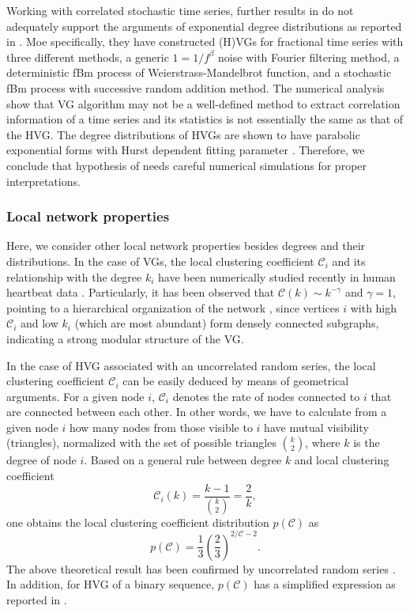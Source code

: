 		Working with correlated stochastic time series, further results in \cite{Manshour2015} do not adequately support the arguments of exponential degree distributions as reported in \cite{Lacasa2010}. Moe specifically, they have constructed (H)VGs for fractional time series with three different methods, a generic $1 = 1 / f^{\beta}$ noise with Fourier filtering method, a deterministic fBm process of Weierstrass-Mandelbrot function, and a stochastic fBm process with successive random addition method. The numerical analysis show that VG algorithm may not be a well-defined method to extract correlation information of a time series and its statistics is not essentially the same as that of the HVG. The degree distributions of HVGs are shown to have parabolic exponential forms with Hurst dependent fitting parameter \cite{Manshour2015}. Therefore, we conclude that hypothesis of \cite{Lacasa2010,Lacasa2014b,Ravetti2014} needs careful numerical simulations for proper interpretations. 
			
		\subsubsection{Local network properties}
		Here, we consider other local network properties besides degrees and their distributions. In the case of VGs, the local clustering coefficient $\mathcal{C}_i$ and its relationship with the degree $k_i$ have been numerically studied recently in human heartbeat data \cite{Shao2010}. Particularly, it has been observed that $\mathcal{C}(k) \sim k^{-\gamma}$ and $\gamma = 1$, pointing to a hierarchical organization of the network \cite{Albert2002}, since vertices $i$ with high $\mathcal{C}_i$ and low $k_i$ (which are most abundant) form densely connected subgraphs, indicating a strong modular structure of the VG. 

		In the case of HVG associated with an uncorrelated random series, the local clustering coefficient $\mathcal{C}_i$ can be easily deduced by means of geometrical arguments. For a given node $i$, $\mathcal{C}_i$ denotes the rate of nodes connected to $i$ that are connected between each other. In other words, we have to calculate from a given node $i$ how many nodes from those visible to $i$ have mutual visibility (triangles), normalized with the set of possible triangles $\binom{k}{2}$, where $k$ is the degree of node $i$. Based on a general rule between degree $k$ and local clustering coefficient
		\begin{equation}
		\mathcal{C}_i(k) = \frac{k-1}{\binom{k}{2}} = \frac{2}{k}, 
		\end{equation}
one obtains the local clustering coefficient distribution $p(\mathcal{C})$ as 
		\begin{equation}
		p(\mathcal{C}) = \frac{1}{3} (\frac{2}{3})^{2/\mathcal{C} -2}. 
		\end{equation}
The above theoretical result has been confirmed by uncorrelated random series \cite{Luque2009}. In addition, for HVG of a binary sequence, $p(\mathcal{C})$ has a simplified expression as reported in \cite{Ahadpour2012}. 
			
